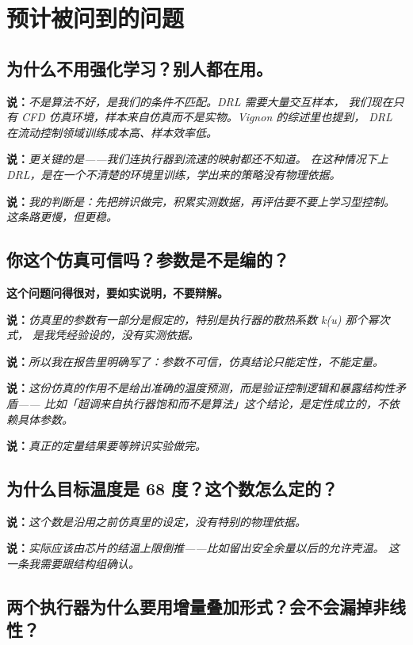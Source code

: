 \documentclass[11pt,a4paper]{ctexart}
\newcommand{\shuo}[1]{\par{\color{cBlue}\bfseries 说：}{\itshape #1}\par}
\begin{document}
\section{预计被问到的问题}

\subsection{为什么不用强化学习？别人都在用。}

\shuo{不是算法不好，是我们的条件不匹配。DRL 需要大量交互样本，
我们现在只有 CFD 仿真环境，样本来自仿真而不是实物。Vignon 的综述里也提到，
DRL 在流动控制领域训练成本高、样本效率低。}

\shuo{更关键的是——我们连执行器到流速的映射都还不知道。
在这种情况下上 DRL，是在一个不清楚的环境里训练，学出来的策略没有物理依据。}

\shuo{我的判断是：先把辨识做完，积累实测数据，再评估要不要上学习型控制。
这条路更慢，但更稳。}

\subsection{你这个仿真可信吗？参数是不是编的？}

\begin{tishi}
\textbf{这个问题问得很对，要如实说明，不要辩解。}
\end{tishi}

\shuo{仿真里的参数有一部分是假定的，特别是执行器的散热系数 k(u) 那个幂次式，
是我凭经验设的，没有实测依据。}

\shuo{所以我在报告里明确写了：参数不可信，仿真结论只能定性，不能定量。}

\shuo{这份仿真的作用不是给出准确的温度预测，而是验证控制逻辑和暴露结构性矛盾——
比如「超调来自执行器饱和而不是算法」这个结论，是定性成立的，不依赖具体参数。}

\shuo{真正的定量结果要等辨识实验做完。}

\subsection{为什么目标温度是 68 度？这个数怎么定的？}

\shuo{这个数是沿用之前仿真里的设定，没有特别的物理依据。}

\shuo{实际应该由芯片的结温上限倒推——比如留出安全余量以后的允许壳温。
这一条我需要跟结构组确认。}

\subsection{两个执行器为什么要用增量叠加形式？会不会漏掉非线性？}
\end{document}
